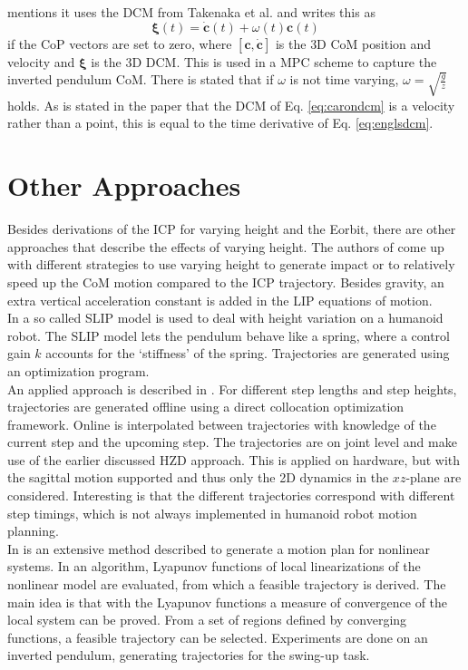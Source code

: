 \cite{caron2018capturability} mentions it uses the \ac{DCM} from Takenaka et al. and writes this as 
\begin{equation}
\boldsymbol{\xi}(t) = \boldsymbol{\dot{c}}(t) + \omega(t)\boldsymbol{c}(t)
\label{eq:carondcm}
\end{equation}
if the \ac{CoP} vectors are set to zero, where $[\boldsymbol{c},\boldsymbol{\dot{c}}]$ is the \ac{3D} \ac{CoM} position and velocity and $\boldsymbol{\xi}$ is the \ac{3D} \ac{DCM}. This is used in a \ac{MPC} scheme to capture the inverted pendulum \ac{CoM}. There is stated that if $\omega$ is not time varying, $\omega=\sqrt{\frac{g}{z}}$ holds. As is stated in the paper that the \ac{DCM} of Eq. \eqref{eq:carondcm} is a velocity rather than a point, this is equal to the time derivative of Eq. \eqref{eq:englsdcm}.

\section{Other Approaches}
Besides derivations of the \ac{ICP} for varying height and the \ac{Eorbit}, there are other approaches that describe the effects of varying height. The authors of \cite{gao2017increase} come up with different strategies to use varying height to generate impact or to relatively speed up the \ac{CoM} motion compared to the \ac{ICP} trajectory. Besides gravity, an extra vertical acceleration constant is added in the \ac{LIP} equations of motion. \\
In \cite{liu2015trajectory} a so called \ac{SLIP} model is used to deal with height variation on a humanoid robot. The \ac{SLIP} model lets the pendulum behave like a spring, where a control gain $k$ accounts for the `stiffness' of the spring. Trajectories are generated using an optimization program.\\
An applied approach is described in \cite{nguyen2017dynamic}. For different step lengths and step heights, trajectories are generated offline using a direct collocation optimization framework. Online is interpolated between trajectories with knowledge of the current step and the upcoming step. The trajectories are on joint level and make use of the earlier discussed \ac{HZD} approach. This is applied on hardware, but with the sagittal motion supported and thus only the \ac{2D} dynamics in the $xz$-plane are considered. Interesting is that the different trajectories correspond with different step timings, which is not always implemented in humanoid robot motion planning.\\
In \cite{tedrake2010lqr} is an extensive method described to generate a motion plan for nonlinear systems. In an algorithm, Lyapunov functions of local linearizations of the nonlinear model are evaluated, from which a feasible trajectory is derived. The main idea is that with the Lyapunov functions a measure of convergence of the local system can be proved. From a set of regions defined by converging functions, a feasible trajectory can be selected. Experiments are done on an inverted pendulum, generating trajectories for the swing-up task.\\

